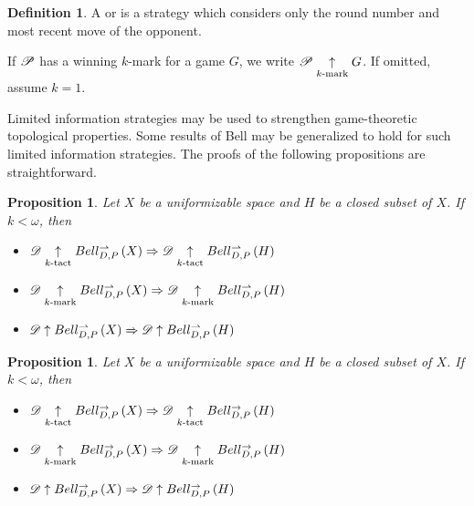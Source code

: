 \documentclass{amsart}
\newtheorem{proposition}[theorem]{Proposition}
\theoremstyle{definition}
\newtheorem{definition}[theorem]{Definition}
\begin{document}
  \begin{definition}
    A  or  is a strategy
    which considers only the round number and most recent move of the
    opponent.

    If \(\mathscr{P}\) has a winning \(k\)-mark for a game \(G\), we write
    \(\mathscr{P}\underset{k\text{-mark}}{\uparrow} G\). If omitted, assume \(k=1\).
  \end{definition}

  Limited information strategies may be used to strengthen game-theoretic
  topological properties.
  Some results of Bell may be generalized to hold for such limited information
  strategies. The proofs of the following propositions are straightforward.

  \begin{proposition}
    Let \(X\) be a uniformizable space and \(H\) be a closed subset of \(X\).
    If \(k<\omega\), then
    \begin{itemize}
      \item
       \(
          \mathscr{D} \underset{k\text{-tact}}{\uparrow} Bell_{D,P}^{\rightharpoonup}\left({X}\right)
            \Rightarrow
          \mathscr{D} \underset{k\text{-tact}}{\uparrow} Bell_{D,P}^{\rightharpoonup}\left({H}\right)
       \)
      \item
       \(
          \mathscr{D} \underset{k\text{-mark}}{\uparrow} Bell_{D,P}^{\rightharpoonup}\left({X}\right)
            \Rightarrow
          \mathscr{D} \underset{k\text{-mark}}{\uparrow} Bell_{D,P}^{\rightharpoonup}\left({H}\right)
       \)
      \item
       \(
          \mathscr{D} \uparrow Bell_{D,P}^{\rightharpoonup}\left({X}\right)
            \Rightarrow
          \mathscr{D} \uparrow Bell_{D,P}^{\rightharpoonup}\left({H}\right)
       \)
    \end{itemize}
  \end{proposition}

  \begin{proposition}
    Let \(X\) be a uniformizable space and \(H\) be a closed subset of \(X\).
    If \(k<\omega\), then
    \begin{itemize}
      \item
       \(
          \mathscr{D} \underset{k\text{-tact}}{\uparrow} Bell_{D,P}^{\to}\left({X}\right)
            \Rightarrow
          \mathscr{D} \underset{k\text{-tact}}{\uparrow} Bell_{D,P}^{\to}\left({H}\right)
       \)
      \item
       \(
          \mathscr{D} \underset{k\text{-mark}}{\uparrow} Bell_{D,P}^{\to}\left({X}\right)
            \Rightarrow
          \mathscr{D} \underset{k\text{-mark}}{\uparrow} Bell_{D,P}^{\to}\left({H}\right)
       \)
      \item
       \(
          \mathscr{D} \uparrow Bell_{D,P}^{\to}\left({X}\right)
            \Rightarrow
          \mathscr{D} \uparrow Bell_{D,P}^{\to}\left({H}\right)
       \)
    \end{itemize}
  \end{proposition}
\end{document}
